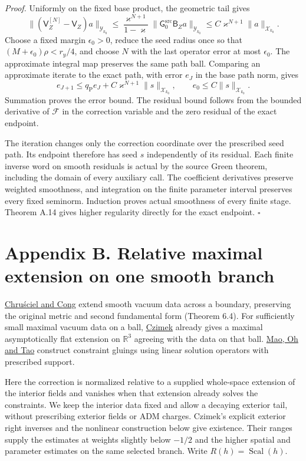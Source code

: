 \documentclass[
  english,
  11pt,
  reqno]{amsart}
\begin{document}
\emph{Proof.} Uniformly on the fixed base product, the geometric tail
gives \[
\|(\mathsf V_Z^{[N]}-\mathsf V_Z)a\|_{\mathcal Y_{k_0}}
\le\frac{\varkappa^{N+1}}{1-\varkappa}
\|\mathsf G_0^{\mathrm{src}}\mathsf B_Za\|_{\mathcal Y_{k_0}}
\le C\varkappa^{N+1}\|a\|_{\mathcal X_{k_0}}.
\] Choose a fixed margin \(\epsilon_0>0\), reduce the seed radius once
so that \((M+\epsilon_0)\rho<r_y/4\), and choose \(N\) with the last
operator error at most \(\epsilon_0\). The approximate integral map
preserves the same path ball. Comparing an approximate iterate to the
exact path, with error \(e_J\) in the base path norm, gives \[
e_{J+1}\le q_{\mathrm P}e_J
+C\varkappa^{N+1}\|s\|_{\mathcal X_{k_0}},
\qquad e_0\le C\|s\|_{\mathcal X_{k_0}}.
\] Summation proves the error bound. The residual bound follows from the
bounded derivative of \(\mathcal F\) in the correction variable and the
zero residual of the exact endpoint.

The iteration changes only the correction coordinate over the prescribed
seed path. Its endpoint therefore has seed \(s\) independently of its
residual. Each finite inverse word on smooth residuals is actual by the
source Green theorem, including the domain of every auxiliary call. The
coefficient derivatives preserve weighted smoothness, and integration on
the finite parameter interval preserves every fixed seminorm. Induction
proves actual smoothness of every finite stage. Theorem A.14 gives
higher regularity directly for the exact endpoint. \hfill\(\square\)

\label{app:online-relative-extension}

\section{Appendix B. Relative maximal extension on one smooth
branch}\label{appendix-b.-relative-maximal-extension-on-one-smooth-branch}

\hyperref[ref-ChruscielCong2023]{Chruściel and Cong} extend smooth
vacuum data across a boundary, preserving the original metric and second
fundamental form (Theorem 6.4). For sufficiently small maximal vacuum
data on a ball, \hyperref[ref-Czimek2018]{Czimek} already gives a
maximal asymptotically flat extension on \(\mathbb R^3\) agreeing with
the data on that ball. \hyperref[ref-MaoOhTao2023]{Mao, Oh and Tao}
construct constraint gluings using linear solution operators with
prescribed support.

Here the correction is normalized relative to a supplied whole-space
extension of the interior fields and vanishes when that extension
already solves the constraints. We keep the interior data fixed and
allow a decaying exterior tail, without prescribing exterior fields or
ADM charges. Czimek's explicit exterior right inverses and the nonlinear
construction below give existence. Their ranges supply the estimates at
weights slightly below \(-1/2\) and the higher spatial and parameter
estimates on the same selected branch. Write
\(R(h)=\operatorname{Scal}(h)\).
\end{document}
